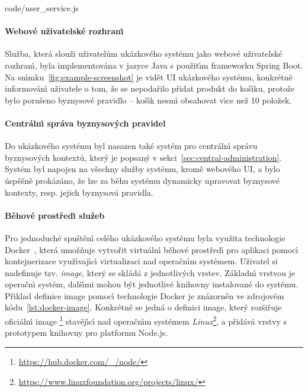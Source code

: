 
{code/user_service.js}

\paragraph{Webové uživatelské rozhran\'{\i}}

Služba, která slouž\'{\i} uživatelům ukázkového systému jako webové uživatelské
rozhran\'{\i}, byla implementována v jazyce Java s použit\'{\i}m frameworku Spring Boot.
Na sn\'{\i}mku~\ref{fig:example-screenshot} je vidět UI ukázkového systému,
konkrétně informován\'{\i} uživatele o tom, že se nepodařilo přidat produkt
do koš\'{\i}ku, protože bylo porušeno byznysové pravidlo – koš\'{\i}k nesm\'{\i} obsahovat
v\'{\i}ce než 10 položek.

\paragraph{Centráln\'{\i} správa byznysov\'ych pravidel}

Do ukázkového systému byl nasazen také systém pro centráln\'{\i} správu byznysov\'ych kontextů,
kter\'y je popsan\'y v sekci~\ref{sec:central-administration}. Systém byl napojen na všechny
služby systému, kromě webového \gls{UI}, a bylo úspěšně prokázáno, že lze za běhu systému
dynamicky upravovat byznysové kontexty, resp. jejich byznysová pravidla.

\paragraph{Běhové prostřed\'{\i} služeb}
Pro jednoduché spuštěn\'{\i} celého ukázkového systému byla využita technologie
Docker~\cite{merkel2014docker}, která umožňuje vytvořit virtuáln\'{\i} běhové prostřed\'{\i}
pro aplikaci pomoc\'{\i} kontejnerizace využ\'{\i}vaj\'{\i}c\'{\i} virtualizaci nad operačn\'{\i}m systémem.
Uživatel si nadefinuje tzv. \textit{image}, kter\'y se skládá z jednotliv\'ych vrstev.
Základn\'{\i} vrstvou je operačn\'{\i} systém, dalš\'{\i}mi mohou b\'yt jednotlivé knihovny instalované do systému.
Př\'{\i}klad definice image pomoc\'{\i} technologie Docker je znázorněn ve zdrojovém
kódu~\ref{lst:docker-image}. Konkrétně se jedná o definici image, kter\'y
rozšiřuje oficiáln\'{\i} image \footnote{\url{https://hub.docker.com/\_/node/}}
stavěj\'{\i}c\'{\i} nad operačn\'{\i}m systémem \textit{Linux}\footnote{\url{https://www.linuxfoundation.org/projects/linux/}},
a přidává vrstvy s prototypem knihovny pro platformu Node.js.


